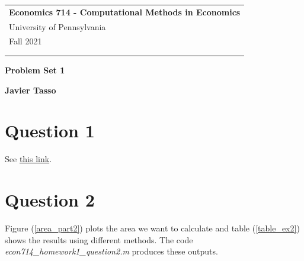 \documentclass[a4paper,12pt]{article}
\begin{document}
\begin{tabular}{p{15.5cm}} 
{\large \bf Economics 714 - Computational Methods in Economics} \\
University of Pennsylvania \\ Fall 2021 \\ \\ 
\hline 
\\
\end{tabular} 

\vspace*{0.3cm} 

\begin{center} 
	{\Large \bf Problem Set 1} 
	\vspace{2mm}
	
        
	{\bf Javier Tasso} 
		
\end{center}  

\vspace{0.4cm}




    
     
    \section*{Question 1} 
    \medskip

    See \href{https://github.com/javiertasso/econ714_hw1_tasso}{this link}. 

     
    
    
    \medskip
    \medskip
    \section*{Question 2}     
    \medskip
    
    Figure (\ref{area_part2}) plots the area we want to calculate and table (\ref{table_ex2}) shows the results using different methods. The code \textit{econ714\_homework1\_question2.m} produces these outputs.  
    
\end{document}
